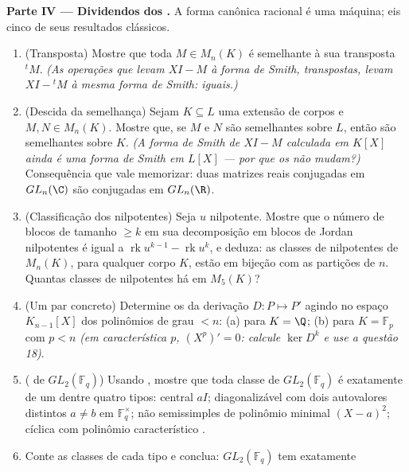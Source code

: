 \begin{problem}
\medskip
\noindent\textbf{Parte IV --- Dividendos dos .} A forma canônica racional é uma máquina; eis cinco de seus
resultados clássicos.
\begin{enumerate}[resume]
  \item (Transposta) Mostre que toda $M \in M_n(K)$ é semelhante à sua
        transposta ${}^tM$. \emph{(As operações que levam
        $XI - M$ à forma de Smith, transpostas, levam $XI - {}^tM$ à mesma
        forma de Smith:  iguais.)}
  \item (Descida da semelhança) Sejam $K \subseteq L$ uma extensão de corpos e
        $M, N \in M_n(K)$. Mostre que, se $M$ e $N$ são semelhantes sobre
        $L$, então são semelhantes sobre $K$. \emph{(A forma de
        Smith de $XI - M$ calculada em $K[X]$ ainda é uma forma
        de Smith em $L[X]$ --- por que os  não
        mudam?)} Consequência que vale memorizar: duas matrizes reais
        conjugadas em $GL_n(\C)$ são conjugadas em $GL_n(\R)$.
  \item (Classificação dos nilpotentes) Seja $u$ nilpotente. Mostre
        que o número de blocos de tamanho $\geq k$ em sua
        decomposição em blocos de Jordan nilpotentes é igual a $\operatorname{rk}u^{k-1} - \operatorname{rk}u^k$, e
        deduza: as classes de nilpotentes de $M_n(K)$, para
        qualquer corpo $K$, estão em bijeção com as partições de
        $n$. Quantas classes de nilpotentes há em $M_5(K)$?
  \item (Um par concreto) Determine os  da
        derivação $D\colon P \mapsto P'$ agindo no espaço $K_{n-1}[X]$ dos polinômios de grau
        $< n$: (a) para $K =
        \Q$; (b) para $K = \mathbb F_p$ com $p < n$
        \emph{(em característica $p$, $(X^p)' = 0$: calcule $\ker D^k$ e use a
        questão 18)}.
  \item ( de $GL_2(\mathbb F_q)$) Usando ,
        mostre que toda classe de $GL_2(\mathbb F_q)$ é exatamente de um dentre
        quatro tipos: central $aI$; diagonalizável com dois
        autovalores distintos $a \neq b$ em $\mathbb F_q^\times$; não semissimples de
        polinômio minimal $(X - a)^2$; cíclica com polinômio característico
        .
  \item Conte as classes de cada tipo e conclua: $GL_2(\mathbb F_q)$ tem exatamente

\end{enumerate}
\end{problem}
